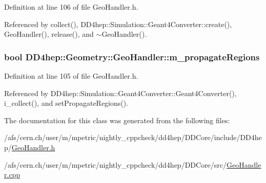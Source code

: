 Definition at line 106 of file GeoHandler.h.

Referenced by collect(), DD4hep::Simulation::Geant4Converter::create(), GeoHandler(), release(), and $\sim$GeoHandler().\hypertarget{class_d_d4hep_1_1_geometry_1_1_geo_handler_a8fa03e76401899e921dffb88684e89be}{
\subsubsection[{m\_\-propagateRegions}]{\setlength{\rightskip}{0pt plus 5cm}bool {\bf DD4hep::Geometry::GeoHandler::m\_\-propagateRegions}}}
\label{class_d_d4hep_1_1_geometry_1_1_geo_handler_a8fa03e76401899e921dffb88684e89be}


Definition at line 105 of file GeoHandler.h.

Referenced by DD4hep::Simulation::Geant4Converter::Geant4Converter(), i\_\-collect(), and setPropagateRegions().

The documentation for this class was generated from the following files:\begin{DoxyCompactItemize}
\item 
/afs/cern.ch/user/m/mpetric/nightly\_\-cppcheck/dd4hep/DDCore/include/DD4hep/\hyperlink{_geo_handler_8h}{GeoHandler.h}\item 
/afs/cern.ch/user/m/mpetric/nightly\_\-cppcheck/dd4hep/DDCore/src/\hyperlink{_geo_handler_8cpp}{GeoHandler.cpp}\end{DoxyCompactItemize}
